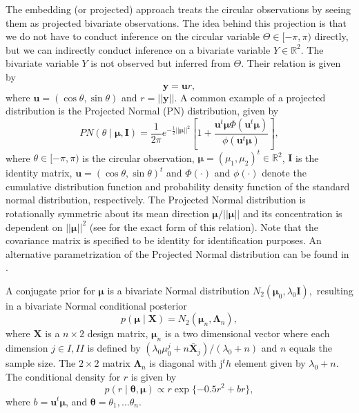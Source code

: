 \documentclass{article}
\begin{document}
The embedding (or projected) approach treats the circular observations
by seeing them as projected bivariate observations. The idea behind this
projection is that we do not have to conduct inference on the circular
variable \(\Theta \in [-\pi, \pi)\) directly, but we can indirectly
conduct inference on a bivariate variable \(Y \in \mathbb{R}^2\). The
bivariate variable \(Y\) is not observed but inferred from \(\Theta\).
Their relation is given by
\begin{equation} \boldsymbol{y} = \boldsymbol{u}r, \end{equation} where
\(\boldsymbol{u} = (\cos \theta, \sin \theta)\) and
\(r = \vert\vert \boldsymbol{y} \vert\vert\). A common example of a
projected distribution is the Projected Normal (PN) distribution, given
by \begin{equation}
PN(\theta \mid \boldsymbol{\mu}, \boldsymbol{I})  = \frac{1}{2 \pi} e^{-\frac{1}{2}\vert \vert \boldsymbol\mu \vert \vert ^ 2} \left[1+\frac{\boldsymbol{u}^t\boldsymbol\mu\Phi(\boldsymbol{u}^t\boldsymbol\mu)}{\phi(\boldsymbol{u}^t\boldsymbol\mu)}\right],
\label{eq:PNdistribution}
\end{equation} where \(\theta \in [-\pi, \pi)\) is the circular
observation,
\(\boldsymbol{\mu} = (\mu_{1}, \mu_{2})^{t} \in \mathbb{R}^2\),
\(\boldsymbol{I}\) is the identity matrix,
\(\boldsymbol{u} = (\cos \theta, \sin \theta)^{t}\) and \(\Phi(\cdot)\)
and \(\phi(\cdot)\) denote the cumulative distribution function and
probability density function of the standard normal distribution,
respectively. The Projected Normal distribution is rotationally
symmetric about its mean direction
\(\boldsymbol{\mu}/\vert\vert\boldsymbol{\mu}\vert\vert\) and its
concentration is dependent on \(\vert\vert\boldsymbol{\mu}\vert\vert^2\)
(see \citet{Kendall1974} for the exact form of this relation). Note that
the covariance matrix is specified to be identity for identification
purposes. An alternative parametrization of the Projected Normal
distribution can be found in \citet{wang2012directional}.

A conjugate prior for \(\boldsymbol{\mu}\) is a bivariate Normal
distribution \(N_2(\boldsymbol{\mu}_0, \lambda_0\boldsymbol{I}),\)
resulting in a bivariate Normal conditional posterior
\citep{Nunez-Antonio2005} \begin{equation}
p(\boldsymbol{\mu} \mid \boldsymbol{X}) = N_2(\boldsymbol{\mu}_n, \boldsymbol{\Lambda}_n),
\end{equation} where \(\boldsymbol{X}\) is a \(n\times2\) design matrix,
\(\boldsymbol{\mu}_n\) is a two dimensional vector where each dimension
\(j \in {I,II}\) is defined by
\((\lambda_0\mu_0^j + n\bar{\boldsymbol{X}}_{j})/(\lambda_0 + n)\) and
\(n\) equals the sample size. The \(2\times2\) matrix
\(\boldsymbol{\Lambda}_n\) is diagonal with j\(^th\) element given by
\(\lambda_0 + n\). The conditional density for \(r\) is given by
\begin{equation}
p(r \mid \boldsymbol{\theta}, \boldsymbol{\mu}) \propto r \exp\{-0.5r^2 + br\},
\end{equation} where \(b = \boldsymbol{u}^t\boldsymbol{\mu}\), and
\(\boldsymbol{\theta} = \theta_1, \dots \theta_n\).
\end{document}
